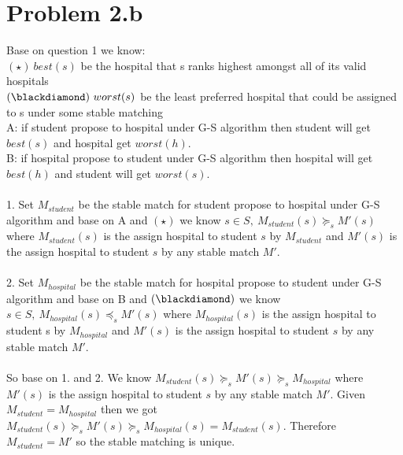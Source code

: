 \documentclass{article}
\begin{document}
\newpage
\section{Problem 2.b}
Base on question 1 we know:\\
$(\star)\ best(s)$ be the hospital that s ranks highest amongst all of its valid hospitals\\
$(\blackdiamond)\ worst(s)$  be the least preferred hospital that could be assigned to s under some stable matching\\
A: if student propose to hospital under G-S algorithm then student will get $best(s)$ and hospital get $worst(h)$. \\
B: if hospital propose to student under G-S algorithm then hospital will get $best(h)$ and student will get $worst(s)$.\\\\
1. Set $M_{student}$ be the stable match for student propose to hospital under G-S algorithm and base on A and $(\star)$ we know $s \in S,\ M_{student}(s) \succeq_{s} M'(s)$ where $M_{student}(s)$ is the assign hospital to student $s$ by $M_{student}$ and $M'(s)$ is the assign hospital to student $s$ by any stable match $M'$.\\\\
2. Set $M_{hospital}$ be the stable match for hospital propose to student under G-S algorithm and base on B and $(\blackdiamond)$ we know $s \in S,\ M_{hospital}(s) \preceq_s M'(s)$ where $ M_{hospital}(s)$ is the assign hospital to student s by $M_{hospital}$ and $M'(s)$ is the assign hospital to student $s$ by any stable match $M'$.\\\\
So base on 1. and 2. We know $M_{student}(s) \succeq_{s} M'(s) \succeq_{s} M_{hospital}$ where $M'(s)$ is the assign hospital to student $s$ by any stable match $M'$. Given $M_{student} = M_{hospital}$ then we got $M_{student}(s) \succeq_{s} M'(s) \succeq_{s} M_{hospital}(s) = M_{student}(s)$. Therefore $M_{student} = M'$ so the stable matching is unique.


\newpage
\end{document}
